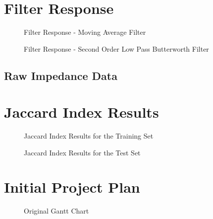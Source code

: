 \documentclass[12pt,openany,a4paper]{book}
\begin{document}
\chapter{Filter Response}
\begin{figure}[!ht]
\centering
\caption{Filter Response - Moving Average Filter}
\label{fig: MAF}
\end{figure}

\begin{figure}[!ht]
\centering
\caption{Filter Response - Second Order Low Pass Butterworth Filter}
\label{fig: Butt}
\end{figure}
\restoregeometry

\begin{landscape}
\chapter{Raw Impedance Data}
%
\end{landscape}

\chapter{Jaccard Index Results}
\begin{figure}[!hb]
\centering
\caption{Jaccard Index Results for the Training Set}
\label{fig: JI1 }
\end{figure}
\begin{figure}[!hb]
\centering
\caption{Jaccard Index Results for the Test Set}
\label{fig: JI2}
\end{figure}
\restoregeometry



\chapter{Initial Project Plan}
%

\begin{landscape}
\begin{figure}[!hb]
\centering
\caption{Original Gantt Chart}
\label{fig: Gant}
\end{figure}
\end{landscape}
\end{document}
